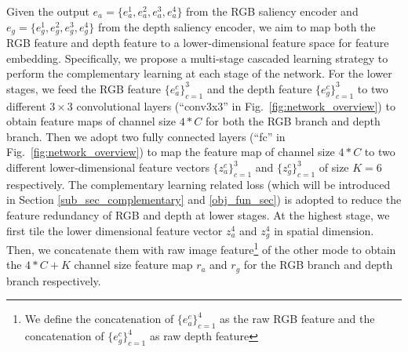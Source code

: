 \documentclass[10pt,twocolumn,letterpaper]{article}
\begin{document}
Given the output $e_a = \{e_a^1,e_a^2,e_a^3,e_a^4\}$ from the RGB saliency encoder and $e_g = \{e_g^1,e_g^2,e_g^3,e_g^4\}$ from the depth saliency encoder, we aim to map both the RGB feature and depth feature to a lower-dimensional feature space for feature embedding.
Specifically, we propose a multi-stage cascaded learning strategy to perform the complementary learning at each stage of the network. For the lower stages, we feed the RGB feature $\{e_a^c\}_{c=1}^3$ and the depth feature $\{e_g^c\}_{c=1}^3$ to two different $3\times3$ convolutional layers (\enquote{conv3x3} in Fig.~\ref{fig:network_overview}) to obtain feature maps of channel size $4*C$ for both the RGB branch and depth branch. Then we adopt two fully connected layers (\enquote{fc} in Fig.~\ref{fig:network_overview}) to map the feature map of channel size $4*C$ to two different lower-dimensional feature vectors $\{z_a^c\}_{c=1}^3$ and $\{z_g^c\}_{c=1}^3$ of size $K=6$ respectively. The complementary learning related loss (which will be introduced in Section \ref{sub_sec_complementary} and \ref{obj_fun_sec}) is adopted to reduce the feature redundancy of RGB and depth at lower stages. 
At the highest stage, we first tile the lower dimensional feature vector $z_a^4$ and $z_g^4$ in spatial dimension. Then, we concatenate them with raw image feature\footnote{We define the concatenation of $\{e_a^c\}_{c=1}^4$ as the raw RGB feature and the concatenation of $\{e_g^c\}_{c=1}^4$ as raw depth feature} of the other mode
to obtain the $4*C+K$ channel size feature map $r_a$ and $r_g$ for the RGB branch and depth branch respectively.
\end{document}
